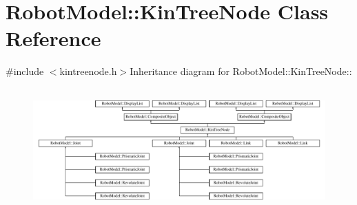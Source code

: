 \hypertarget{class_robot_model_1_1_kin_tree_node}{
\section{RobotModel::KinTreeNode Class Reference}
\label{class_robot_model_1_1_kin_tree_node}
}


{\ttfamily \#include $<$kintreenode.h$>$}Inheritance diagram for RobotModel::KinTreeNode::\begin{figure}[H]
\begin{center}
\leavevmode
\includegraphics[height=4.76596cm]{class_robot_model_1_1_kin_tree_node}
\end{center}
\end{figure}
